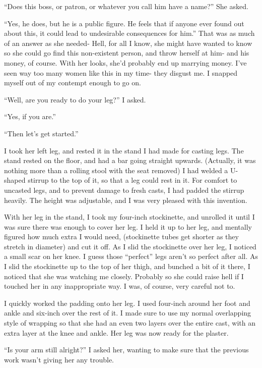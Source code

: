 ``Does this boss, or patron, or whatever you call him have a name?'' She asked.

``Yes, he does, but he is a public figure. He feels that if anyone ever found out about
this, it could lead to undesirable consequences for him.'' That was as much of an answer as she
needed- Hell, for all I know, she might have wanted to know so she could go find this
non-existent person, and throw herself at him- and his money, of course. With her looks, she'd
probably end up marrying money. I've seen way too many women like this in my time- they disgust
me. I snapped myself out of my contempt enough to go on.

``Well, are you ready to do your leg?'' I asked.

``Yes, if you are.''

``Then let's get started.''

I took her left leg, and rested it in the stand I had made for casting legs. The stand
rested on the floor, and had a bar going straight upwards. (Actually, it was nothing more than a
rolling stool with the seat removed) I had welded a U-shaped stirrup to the top of it, so that a
leg could rest in it. For comfort to uncasted legs, and to prevent damage to fresh casts, I had
padded the stirrup heavily. The height was adjustable, and I was very pleased with this
invention.

With her leg in the stand, I took my four-inch stockinette, and unrolled it until I was sure
there was enough to cover her leg. I held it up to her leg, and mentally figured how much extra
I would need, (stockinette tubes get shorter as they stretch in diameter) and cut it off. As I
slid the stockinette over her leg, I noticed a small scar on her knee. I guess those ``perfect''
legs aren't so perfect after all. As I slid the stockinette up to the top of her thigh, and
bunched a bit of it there, I noticed that she was watching me closely. Probably so she could
raise hell if I touched her in any inappropriate way. I was, of course, very careful not to.

I quickly worked the padding onto her leg. I used four-inch around her foot and ankle and
six-inch over the rest of it. I made sure to use my normal overlapping style of wrapping so that
she had an even two layers over the entire cast, with an extra layer at the knee and ankle. Her
leg was now ready for the plaster.

``Is your arm still alright?'' I asked her, wanting to make sure that the previous work
wasn't giving her any trouble.

